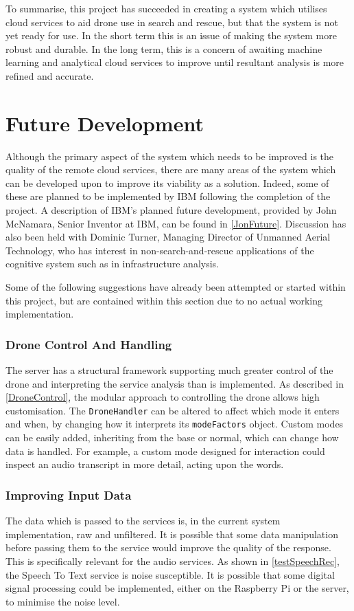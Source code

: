 \documentclass{article}
\begin{document}
To summarise, this project has succeeded in creating a system which utilises cloud services to aid drone use in search and rescue, but that the system is not yet ready for use. In the short term this is an issue of making the system more robust and durable. In the long term, this is a concern of awaiting machine learning and analytical cloud services to improve until resultant analysis is more refined and accurate.

\section{Future Development}\label{FutureDevelopment}
Although the primary aspect of the system which needs to be improved is the quality of the remote cloud services, there are many areas of the system which can be developed upon to improve its viability as a solution. Indeed, some of these are planned to be implemented by IBM following the completion of the project. A description of IBM's planned future development, provided by John McNamara, Senior Inventor at IBM, can be found in \ref{JonFuture}. Discussion has also been held with Dominic Turner, Managing Director of Unmanned Aerial Technology\cite{UAT}, who has interest in non-search-and-rescue applications of the cognitive system such as in infrastructure analysis. 

Some of the following suggestions have already been attempted or started within this project, but are contained within this section due to no actual working implementation.

\subsubsection{Drone Control And Handling}
The server has a structural framework supporting much greater control of the drone and interpreting the service analysis than is implemented. As described in \ref{DroneControl}, the modular approach to controlling the drone allows high customisation. The \texttt{DroneHandler} can be altered to affect which mode it enters and when, by changing how it interprets its \texttt{modeFactors} object. Custom modes can be easily added, inheriting from the base or normal, which can change how data is handled. For example, a custom mode designed for interaction could inspect an audio transcript in more detail, acting upon the words. 

\subsubsection{Improving Input Data}
The data which is passed to the services is, in the current system implementation, raw and unfiltered. It is possible that some data manipulation before passing them to the service would improve the quality of the response. This is specifically relevant for the audio services. As shown in \ref{testSpeechRec}, the Speech To Text service is noise susceptible. It is possible that some digital signal processing could be implemented, either on the Raspberry Pi or the server, to minimise the noise level.
\end{document}
